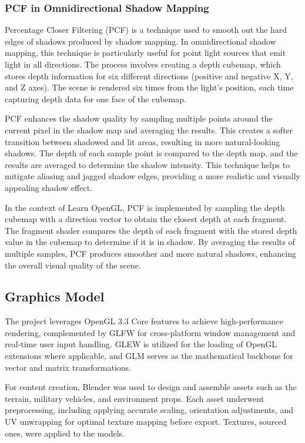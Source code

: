 \documentclass[12pt]{article}
\begin{document}
	\subsubsection{PCF in Omnidirectional Shadow Mapping}
	Percentage Closer Filtering (PCF) is a technique used to smooth out the hard edges of shadows produced by shadow mapping. In omnidirectional shadow mapping, this technique is particularly useful for point light sources that emit light in all directions. The process involves creating a depth cubemap, which stores depth information for six different directions (positive and negative X, Y, and Z axes). The scene is rendered six times from the light's position, each time capturing depth data for one face of the cubemap.
	
	PCF enhances the shadow quality by sampling multiple points around the current pixel in the shadow map and averaging the results. This creates a softer transition between shadowed and lit areas, resulting in more natural-looking shadows. The depth of each sample point is compared to the depth map, and the results are averaged to determine the shadow intensity. This technique helps to mitigate aliasing and jagged shadow edges, providing a more realistic and visually appealing shadow effect.
	
	In the context of Learn OpenGL, PCF is implemented by sampling the depth cubemap with a direction vector to obtain the closest depth at each fragment. The fragment shader compares the depth of each fragment with the stored depth value in the cubemap to determine if it is in shadow. By averaging the results of multiple samples, PCF produces smoother and more natural shadows, enhancing the overall visual quality of the scene.
	
	\subsection{Graphics Model}
	The project leverages OpenGL 3.3 Core features to achieve high-performance rendering, complemented by GLFW for cross-platform window management and real-time user input handling. GLEW is utilized for the loading of OpenGL extensions where applicable, and GLM serves as the mathematical backbone for vector and matrix transformations.
	
	For content creation, Blender was used to design and assemble assets such as the terrain, military vehicles, and environment props. Each asset underwent preprocessing, including applying accurate scaling, orientation adjustments, and UV unwrapping for optimal texture mapping before export. Textures, sourced ones, were applied to the models.
	
\end{document}

